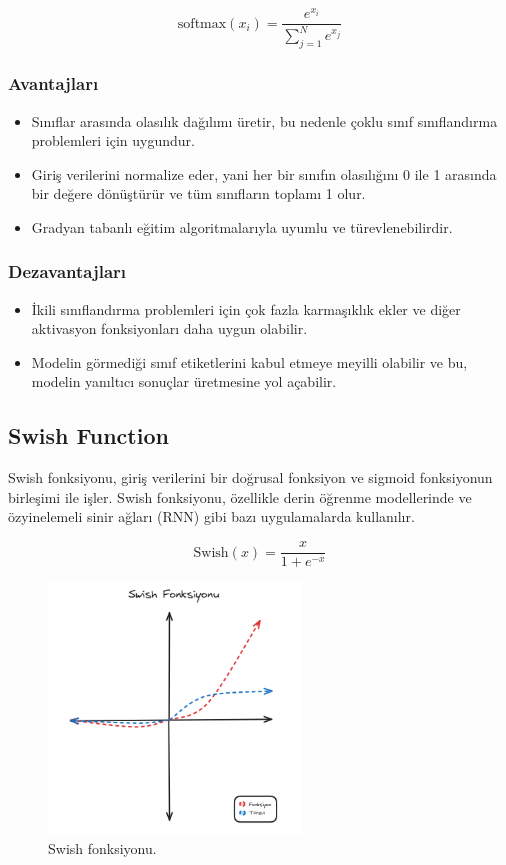 \[\text{softmax}(x_i) = \frac{e^{x_i}}{\sum_{j=1}^{N} e^{x_j}}\]

\subsubsection{Avantajları}
\begin{itemize}
    \item Sınıflar arasında olasılık dağılımı üretir, bu nedenle çoklu sınıf sınıflandırma problemleri için uygundur.
    \item Giriş verilerini normalize eder, yani her bir sınıfın olasılığını 0 ile 1 arasında bir değere dönüştürür ve tüm sınıfların toplamı 1 olur.
    \item Gradyan tabanlı eğitim algoritmalarıyla uyumlu ve türevlenebilirdir.
\end{itemize}

\subsubsection{Dezavantajları}
\begin{itemize}
    \item İkili sınıflandırma problemleri için çok fazla karmaşıklık ekler ve diğer aktivasyon fonksiyonları daha uygun olabilir.
    \item Modelin görmediği sınıf etiketlerini kabul etmeye meyilli olabilir ve bu, modelin yanıltıcı sonuçlar üretmesine yol açabilir.
\end{itemize}

\newpage

\subsection{Swish Function}
Swish fonksiyonu, giriş verilerini bir doğrusal fonksiyon ve sigmoid fonksiyonun birleşimi ile işler. Swish fonksiyonu, özellikle derin öğrenme modellerinde ve özyinelemeli sinir ağları (RNN) gibi bazı uygulamalarda kullanılır.

\[\text{Swish}(x) = \frac{x}{1 + e^{-x}}\]

\begin{figure}[h]
    \centering
    \includegraphics[width=0.6\textwidth]{images/swish_function.png}
    \caption{Swish fonksiyonu.}
    \label{fig:enter-label}
\end{figure}

